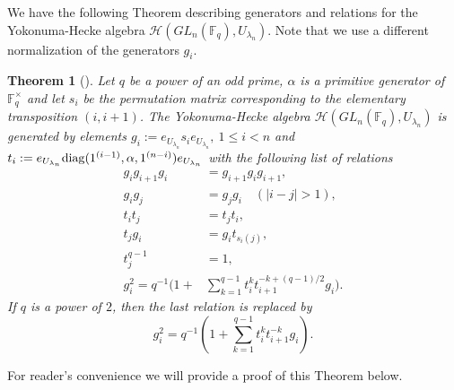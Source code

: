 \documentclass[12pt,reqno]{amsart}
\newtheorem{thm}{Theorem}[section]
\theoremstyle{definition}
\theoremstyle{remark}
\numberwithin{equation}{section}
\newcommand{\GL}[1]{GL_{#1}(\mathbb{F}_q)}
\def\IM#1{\textcolor[rgb]{0.00,0.00,0.75}{[I: #1]}}
\begin{document}
We have the following Theorem describing generators and relations for the Yokonuma-Hecke algebra $\mathcal{H}(\GL{n},U_{\lambda_n})$. Note that we use a different normalization of the generators $g_i$.
\begin{thm}[\cite{JJ,Yok}]\label{Yok_generators}
    Let $q$ be a power of an odd prime, $\alpha$ is a primitive generator of $\mathbb{F}_q^{\times}$ and let $s_i$ be the permutation matrix corresponding to the elementary transposition $(i,i+1)$. The Yokonuma-Hecke algebra $\mathcal{H}(\GL{n},U_{\lambda_n})$ is generated by elements $g_i:=e_{U_{\lambda_n}} s_ie_{U_{\lambda_n}},\ 1\le i<n$ and $t_i:=e_{U_{\lambda_n}} {\rm diag}(1^{(i-1)},\alpha, 1^{(n-i)})e_{U_{\lambda_n}}$ with the following list of relations
    \begin{align}
        g_i g_{i+1} g_i &= g_{i+1}g_i g_{i+1},\\\label{braid_1}
        g_i g_j &= g_j g_i \quad (|i-j| > 1),\\\label{braid_2}
        t_i t_j &= t_j t_i,\\\label{torus_1}
        t_j g_i &= g_i t_{s_i(j)},\\\label{torus-permutation}
        t_j^{q-1} &= 1,\\\label{torus_2}
        g_i^2 = q^{-1}(1 +& \sum_{k=1}^{q-1}t_i^kt_{i+1}^{-k+(q-1)/2} g_i).
    \end{align}
    If $q$ is a power of $2$, then the last relation is replaced by
    \begin{equation}
        g_i^2 = q^{-1}(1 + \sum_{k=1}^{q-1}t_i^kt_{i+1}^{-k} g_i).
    \end{equation}
\end{thm}

For reader's convenience we will provide a proof of this Theorem below.
\end{document}
